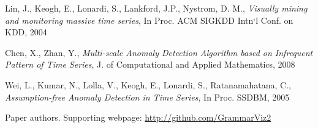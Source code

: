 \begin{thebibliography}{99}
Lin, J., Keogh, E., Lonardi, S., Lankford, J.P., Nystrom, D. M.,
{\em Visually mining and monitoring massive time series},
In Proc. ACM SIGKDD Intn`l Conf. on KDD, 2004

Chen, X., Zhan, Y.,
{\em Multi-scale Anomaly Detection Algorithm based on Infrequent Pattern of Time Series},
J. of Computational and Applied Mathematics, 2008

Wei, L., Kumar, N., Lolla, V., Keogh, E., Lonardi, S., Ratanamahatana, C.,
{\em Assumption-free Anomaly Detection in Time Series},
In Proc. SSDBM, 2005


Paper authors. Supporting webpage:
\url{http://github.com/GrammarViz2}

\end{thebibliography}
